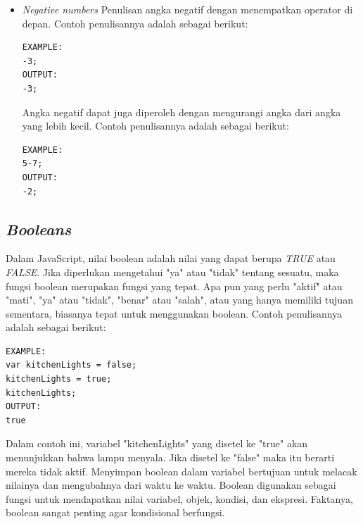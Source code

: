 \begin{itemize}
        \item \textit{Negative numbers}\newline
        Penulisan angka negatif dengan menempatkan operator di depan. Contoh penulisannya adalah sebagai berikut: 
        \begin{lstlisting}[basicstyle=\ttfamily, frame=single,
    columns=fullflexible, breaklines=true, numbers=none]
EXAMPLE:
-3;
OUTPUT:
-3;
        \end{lstlisting}
        Angka negatif dapat juga diperoleh dengan mengurangi angka dari angka yang lebih kecil. Contoh penulisannya adalah sebagai berikut: 
        \begin{lstlisting}[basicstyle=\ttfamily, frame=single,
    columns=fullflexible, breaklines=true, numbers=none]
EXAMPLE:
5-7;
OUTPUT:
-2;
        \end{lstlisting}
    \end{itemize}

\subsection{\textit{Booleans}}
\label{sec: Booleans}
    Dalam JavaScript, nilai boolean adalah nilai yang dapat berupa \textit{TRUE} atau \textit{FALSE}\cite{javascriptlearn}. Jika diperlukan mengetahui "ya" atau "tidak" tentang sesuatu, maka fungsi boolean merupakan fungsi yang tepat. Apa pun yang perlu "aktif" atau "mati", "ya" atau "tidak", "benar" atau "salah", atau yang hanya memiliki tujuan sementara, biasanya tepat untuk menggunakan boolean. Contoh penulisannya adalah sebagai berikut:
    \begin{lstlisting}[basicstyle=\ttfamily, frame=single,
    columns=fullflexible, breaklines=true, numbers=none]
EXAMPLE:
var kitchenLights = false;
kitchenLights = true;
kitchenLights;
OUTPUT:
true
        \end{lstlisting}
        Dalam contoh ini, variabel "kitchenLights" yang disetel ke "true" akan menunjukkan bahwa lampu menyala. Jika disetel ke "false" maka itu berarti mereka tidak aktif. Menyimpan boolean dalam variabel bertujuan untuk melacak nilainya dan mengubahnya dari waktu ke waktu. Boolean digunakan sebagai fungsi untuk mendapatkan nilai variabel, objek, kondisi, dan ekspresi. Faktanya, boolean sangat penting agar kondisional berfungsi.
        
